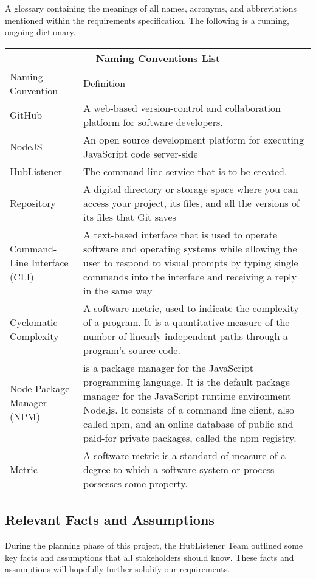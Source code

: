 \documentclass{article}
\begin{document}
A glossary containing the meanings of all names, acronyms, and abbreviations mentioned within the requirements specification. The following is a running, ongoing dictionary. 
\newline
\begin{tabular}{ |p{6cm}||p{6cm}| }
\hline
\multicolumn{2}{|c|}{Naming Conventions List} \\
\hline
Naming Convention & Definition\\
\hline 
GitHub & A web-based version-control and collaboration platform for software developers. \\
\hline
NodeJS & An open source development platform for executing JavaScript code server-side \\
\hline
HubListener & The command-line service that is to be created.\\
\hline
Repository & A digital directory or storage space where you can access your project, its files, and all the versions of its files that Git saves\\
\hline
Command-Line Interface (CLI) & A text-based interface that is used to operate software and operating systems while allowing the user to respond to visual prompts by typing single commands into the interface and receiving a reply in the same way\\
\hline
Cyclomatic Complexity & A software metric, used to indicate the complexity of a program. It is a quantitative measure of the number of linearly independent paths through a program's source code.\\
\hline 
Node Package Manager (NPM) & is a package manager for the JavaScript programming language. It is the default package manager for the JavaScript runtime environment Node.js. It consists of a command line client, also called npm, and an online database of public and paid-for private packages, called the npm registry.\\
\hline 
Metric &A software metric is a standard of measure of a degree to which a software system or process possesses some property.\\
\hline 
\end{tabular}
\newpage

\subsection{Relevant Facts and Assumptions}
During the planning phase of this project, the HubListener Team outlined some key facts and assumptions that all stakeholders should know. These facts and assumptions will hopefully further solidify our requirements. \newline
\end{document}
